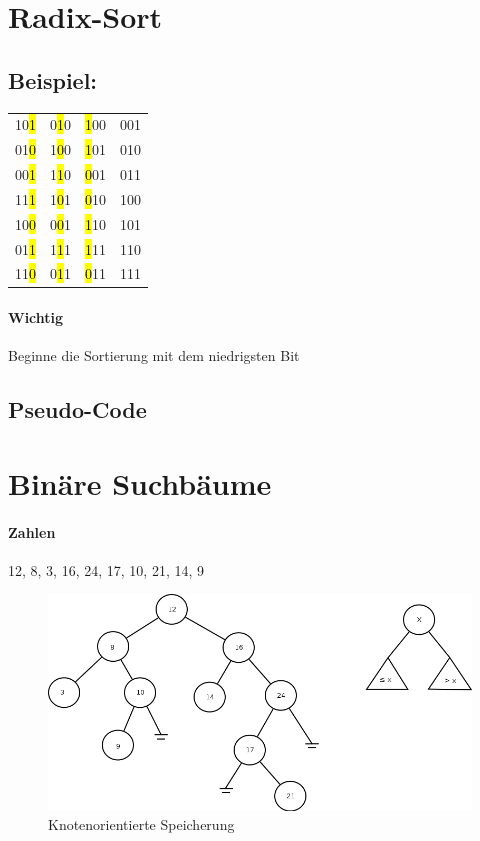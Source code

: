 \section{Radix-Sort}

\subsection{Beispiel:}
\begin{tabular}{l l l l}
  10\hl{1} & 0\hl{1}0 & \hl{1}00 & 001 \\
  01\hl{0} & 1\hl{0}0 & \hl{1}01 & 010\\
  00\hl{1} & 1\hl{1}0 & \hl{0}01 & 011 \\
  11\hl{1} & 1\hl{0}1 & \hl{0}10 & 100 \\
  10\hl{0} & 0\hl{0}1 & \hl{1}10 & 101 \\
  01\hl{1} & 1\hl{1}1 & \hl{1}11 & 110 \\
  11\hl{0} & 0\hl{1}1 & \hl{0}11 & 111 \\
\end{tabular}
\paragraph{Wichtig}Beginne die Sortierung mit dem niedrigsten Bit

\subsection{Pseudo-Code}



\pagebreak

\section{Binäre Suchbäume}

\paragraph{Zahlen} 12, 8, 3, 16, 24, 17, 10, 21, 14, 9 

\begin{figure}[H]
\includegraphics[width=\linewidth]{09/Grafik/img3.png}
\captionsetup{justification=raggedright, singlelinecheck=false}
\caption{Knotenorientierte Speicherung}
\end{figure}

